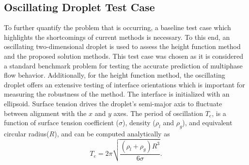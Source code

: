 \subsection{Oscillating Droplet Test Case}
To further quantify the problem that is occurring, a baseline test case which highlights the shortcomings of current methods is necessary. To this end, an oscillating two-dimensional droplet is used to assess the height function method and the proposed solution methods. This test case was chosen as it is considered a standard benchmark problem for testing the accurate prediction of multiphase flow behavior\cite{Salih2002}. Additionally, for the height function method, the oscillating droplet offers an extensive testing of interface orientations which is important for measuring the robustness of the method. The interface is initialized with an ellipsoid. Surface tension drives the droplet's semi-major axis to fluctuate between alignment with the $x$ and $y$ axes. The period of oscillation $T_{e}$, is a function of surface tension coefficient ($\sigma$), density ($\rho_l$ and $\rho_g$), and equivalent circular radius($R$), and can be computed analytically as~\cite{Rayleigh}
\begin{equation}
T_{e} = 2 \pi \sqrt{\frac{(\rho_{l}+\rho_{g})R^3}{6\sigma}}.
\label{period}
\end{equation}


















































